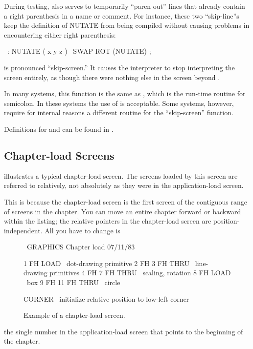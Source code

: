 During testing, \forth{\backslash} also serves to temporarily ``paren
out'' lines that already contain a right parenthesis in a name or
comment.  For instance, these two ``skip-line''s keep the definition
of NUTATE from being compiled without causing problems in encountering
either right parenthesis:
\begin{Code}
\ : NUTATE ( x y z )
\   SWAP ROT  (NUTATE) ;
\end{Code}
 is pronounced ``skip-screen.'' It causes the
\Forth{} interpreter to stop interpreting the screen entirely, as
though there were nothing else in the screen beyond .

In many \Forth{} systems, this function is the same as , which
is the run-time routine for semicolon.  In these systems the use of  is
acceptable.  Some \Forth{} systems, however, require for internal reasons
a different routine for the ``skip-screen'' function.

Definitions for \forth{\backslash} and  can be found in .

\subsection{Chapter-load Screens}

 illustrates a typical chapter-load screen.  The screens loaded by
this screen are referred to relatively, not absolutely as they were in the
application-load screen.

This is because the chapter-load screen is the first screen of the contiguous
range of screens in the chapter.  You can move an entire chapter
forward or backward within the listing; the relative pointers in the
chapter-load screen are position-independent.  All you have to change is
\begin{figure*}
\caption{Example of a chapter-load screen.}

\setcounter{screen}{100}
\begin{Screen}
\ GRAPHICS                 Chapter load                 07/11/83

 1 FH LOAD            \ dot-drawing primitive
 2 FH 3 FH THRU       \ line-drawing primitives
 4 FH 7 FH THRU       \ scaling, rotation
 8 FH LOAD            \ box
 9 FH 11 FH THRU      \ circle



CORNER  \ initialize relative position to low-left corner





\end{Screen}
\end{figure*}
the single number in the application-load screen that points to the beginning
of the chapter.

